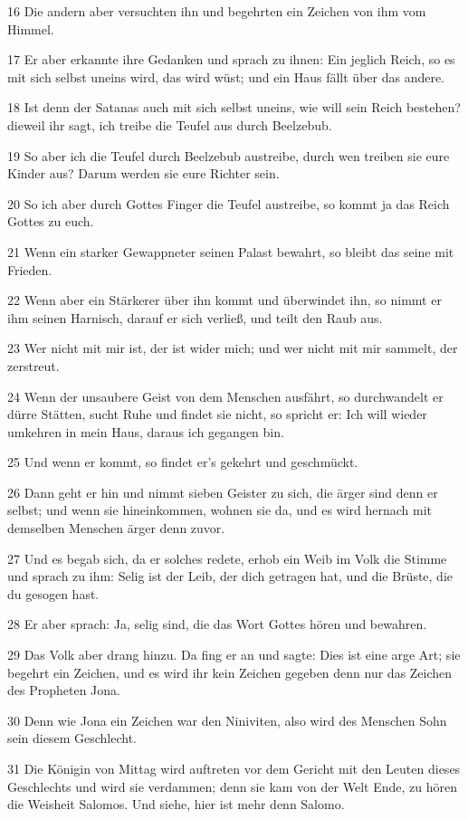 \par 16 Die andern aber versuchten ihn und begehrten ein Zeichen von ihm vom Himmel.
\par 17 Er aber erkannte ihre Gedanken und sprach zu ihnen: Ein jeglich Reich, so es mit sich selbst uneins wird, das wird wüst; und ein Haus fällt über das andere.
\par 18 Ist denn der Satanas auch mit sich selbst uneins, wie will sein Reich bestehen? dieweil ihr sagt, ich treibe die Teufel aus durch Beelzebub.
\par 19 So aber ich die Teufel durch Beelzebub austreibe, durch wen treiben sie eure Kinder aus? Darum werden sie eure Richter sein.
\par 20 So ich aber durch Gottes Finger die Teufel austreibe, so kommt ja das Reich Gottes zu euch.
\par 21 Wenn ein starker Gewappneter seinen Palast bewahrt, so bleibt das seine mit Frieden.
\par 22 Wenn aber ein Stärkerer über ihn kommt und überwindet ihn, so nimmt er ihm seinen Harnisch, darauf er sich verließ, und teilt den Raub aus.
\par 23 Wer nicht mit mir ist, der ist wider mich; und wer nicht mit mir sammelt, der zerstreut.
\par 24 Wenn der unsaubere Geist von dem Menschen ausfährt, so durchwandelt er dürre Stätten, sucht Ruhe und findet sie nicht, so spricht er: Ich will wieder umkehren in mein Haus, daraus ich gegangen bin.
\par 25 Und wenn er kommt, so findet er's gekehrt und geschmückt.
\par 26 Dann geht er hin und nimmt sieben Geister zu sich, die ärger sind denn er selbst; und wenn sie hineinkommen, wohnen sie da, und es wird hernach mit demselben Menschen ärger denn zuvor.
\par 27 Und es begab sich, da er solches redete, erhob ein Weib im Volk die Stimme und sprach zu ihm: Selig ist der Leib, der dich getragen hat, und die Brüste, die du gesogen hast.
\par 28 Er aber sprach: Ja, selig sind, die das Wort Gottes hören und bewahren.
\par 29 Das Volk aber drang hinzu. Da fing er an und sagte: Dies ist eine arge Art; sie begehrt ein Zeichen, und es wird ihr kein Zeichen gegeben denn nur das Zeichen des Propheten Jona.
\par 30 Denn wie Jona ein Zeichen war den Niniviten, also wird des Menschen Sohn sein diesem Geschlecht.
\par 31 Die Königin von Mittag wird auftreten vor dem Gericht mit den Leuten dieses Geschlechts und wird sie verdammen; denn sie kam von der Welt Ende, zu hören die Weisheit Salomos. Und siehe, hier ist mehr denn Salomo.
